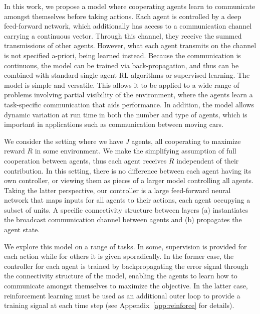 \documentclass{article}
\newcommand{\append}[1]{Appendix~\ref{app:#1}}
\begin{document}
In this work, we propose a model where cooperating agents learn to
communicate amongst themselves before taking actions. Each agent is controlled by a deep
feed-forward network, which additionally has access to a communication
channel carrying a continuous vector. Through this
channel, they receive the summed transmissions of other
agents. However, what each agent transmits on the channel is not
specified a-priori, being learned instead.  Because the communication
is continuous, the model can be trained via back-propagation, and thus
can be combined with standard single agent RL algorithms or supervised learning.  The model
is simple and versatile. This allows
it to be applied to a wide range of problems involving partial
visibility of the environment, where the agents learn a task-specific
communication that aids performance. 
In addition, the model allows dynamic variation at run
time in both the number and type of agents, which is important in applications 
such as communication between moving cars.


We consider the setting where we have $J$ agents, all cooperating to
maximize reward $R$ in some environment.  We make the simplifying
assumption of full cooperation between agents, thus each agent receives $R$ independent of their
contribution. In this setting, there is no difference between each
agent having its own controller, or viewing them as pieces of a larger
model controlling all agents. Taking the latter perspective, our controller
is a large feed-forward neural network that maps inputs for all agents
to their actions, each agent occupying a subset of units. A specific
connectivity structure between layers (a) instantiates the broadcast
communication channel between agents and (b) propagates the agent
state.

We explore this model on a range of tasks. In some,
supervision is provided for each action while for others it is given
sporadically. In the former case, the controller for each agent is trained
by backpropagating the error signal through the connectivity
structure of the model, enabling the agents to learn how to
communicate amongst themselves to maximize the objective. In the
latter case, reinforcement learning must be used as an additional outer loop to
provide a training signal at each time step (see \append{reinforce} for
details).  


\vspace{-2.5mm}
\end{document}
